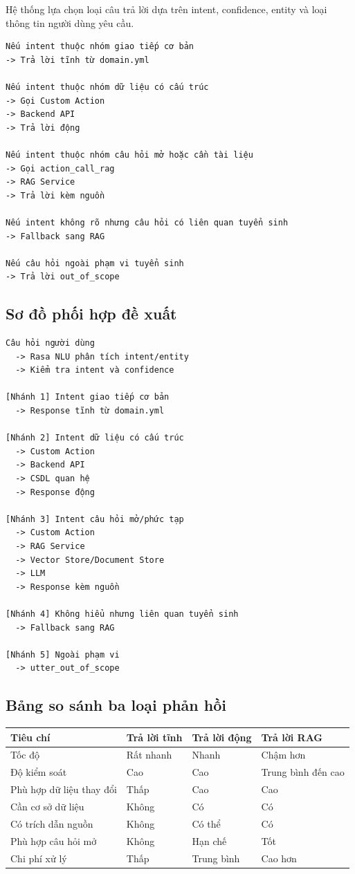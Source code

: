 Hệ thống lựa chọn loại câu trả lời dựa trên intent, confidence, entity và loại thông tin người dùng yêu cầu.

\begin{verbatim}
Nếu intent thuộc nhóm giao tiếp cơ bản
-> Trả lời tĩnh từ domain.yml

Nếu intent thuộc nhóm dữ liệu có cấu trúc
-> Gọi Custom Action
-> Backend API
-> Trả lời động

Nếu intent thuộc nhóm câu hỏi mở hoặc cần tài liệu
-> Gọi action_call_rag
-> RAG Service
-> Trả lời kèm nguồn

Nếu intent không rõ nhưng câu hỏi có liên quan tuyển sinh
-> Fallback sang RAG

Nếu câu hỏi ngoài phạm vi tuyển sinh
-> Trả lời out_of_scope
\end{verbatim}

\subsection*{Sơ đồ phối hợp đề xuất}

\begin{verbatim}
Câu hỏi người dùng
  -> Rasa NLU phân tích intent/entity
  -> Kiểm tra intent và confidence

[Nhánh 1] Intent giao tiếp cơ bản
  -> Response tĩnh từ domain.yml

[Nhánh 2] Intent dữ liệu có cấu trúc
  -> Custom Action
  -> Backend API
  -> CSDL quan hệ
  -> Response động

[Nhánh 3] Intent câu hỏi mở/phức tạp
  -> Custom Action
  -> RAG Service
  -> Vector Store/Document Store
  -> LLM
  -> Response kèm nguồn

[Nhánh 4] Không hiểu nhưng liên quan tuyển sinh
  -> Fallback sang RAG

[Nhánh 5] Ngoài phạm vi
  -> utter_out_of_scope
\end{verbatim}

\subsection*{Bảng so sánh ba loại phản hồi}

\begin{table}[H]
\centering
\begin{tabular}{|l|l|l|l|}
\hline
\textbf{Tiêu chí} & \textbf{Trả lời tĩnh} & \textbf{Trả lời động} & \textbf{Trả lời RAG} \\
\hline
Tốc độ & Rất nhanh & Nhanh & Chậm hơn \\
\hline
Độ kiểm soát & Cao & Cao & Trung bình đến cao \\
\hline
Phù hợp dữ liệu thay đổi & Thấp & Cao & Cao \\
\hline
Cần cơ sở dữ liệu & Không & Có & Có \\
\hline
Có trích dẫn nguồn & Không & Có thể & Có \\
\hline
Phù hợp câu hỏi mở & Không & Hạn chế & Tốt \\
\hline
Chi phí xử lý & Thấp & Trung bình & Cao hơn \\
\hline
\end{tabular}
\end{table}

